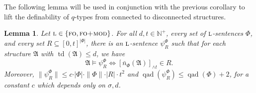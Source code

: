 \documentclass[11pt]{article}
\newtheorem{lemma}[theorem]{Lemma}
\newcommand{\logic}[1]{\textsc{#1}}
\newcommand{\logl}{\logic{l}}
\newcommand{\FO}{\logic{fo}}
\newcommand{\FOmod}{\logic{fo+mod}}
\newcommand{\redmax}[2]{[#1]_{{\wedge}#2}}
\newcommand{\size}[1]{\|#1\|}
\newcommand{\qad}[1]{\operatorname{qad}(#1)}
\newcommand{\absval}[1]{\vert #1 \vert}
\newcommand{\struct}[1]{\mathfrak{#1}}
\newcommand{\AS}{\struct{A}}
\newcommand{\td}{\operatorname{td}}
\newcommand{\set}[1]{\{#1\}}
\newcommand{\Npos}{\mathbb{N}^{+}}
\begin{document}
The following lemma will be used in conjunction with the previous corollary to
lift the definability of $q$-types from connected to disconnected structures.
\begin{lemma}
  \label{lem:counting-formulae}
  Let $\logl\in \set{\FO{}, \FOmod{}}$. For all $d,t\in \Npos$, every
  set of $\logl$-sen\-tences $\Phi$, and every set
  $R\subseteq[0,t]^{\vert \Phi \vert}$, there is an $\logl$-sentence
  $\psi^{\Phi}_{R}$ such that for each structure $\AS$ with $\td(\AS)
  \leq d$, we have
  \[ \AS\models \psi^{\Phi}_{R} \iff \redmax{\bar n_{\Phi}(\AS)}{t} \in R. \]
  Moreover, 
    $\size{\psi^{\Phi}_{R}} \leq c \cdot
  \absval{\Phi} \cdot \size{\Phi}\cdot \vert R \vert \cdot t^2$ and
  $\qad{\psi^{\Phi}_{R}} \leq \qad{\Phi} + 2$,
for a constant $c$ which depends only on $\sigma,d$.
\end{lemma}
\end{document}
